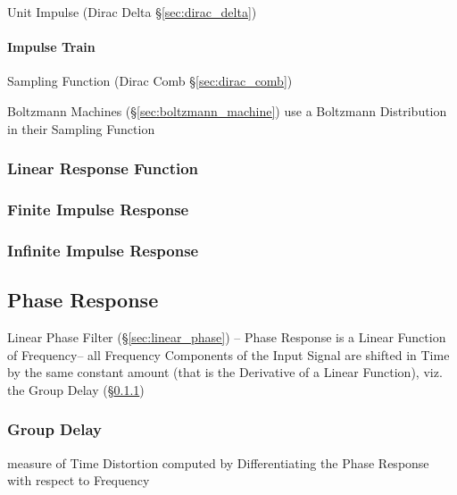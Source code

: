 Unit Impulse (Dirac Delta \S\ref{sec:dirac_delta})



\paragraph{Impulse Train}\label{sec:impulse_train}\hfill

Sampling Function (Dirac Comb \S\ref{sec:dirac_comb})

Boltzmann Machines (\S\ref{sec:boltzmann_machine}) use a Boltzmann Distribution
in their Sampling Function



\subsubsection{Linear Response Function}\label{sec:linear_response}

\subsubsection{Finite Impulse Response}\label{sec:fir}

\subsubsection{Infinite Impulse Response}\label{sec:iir}



\subsection{Phase Response}\label{sec:phase_response}

Linear Phase Filter (\S\ref{sec:linear_phase}) -- Phase Response is a Linear
Function of Frequency-- all Frequency Components of the Input Signal are shifted
in Time by the same constant amount (that is the Derivative of a Linear
Function), viz. the Group Delay (\S\ref{sec:group_delay})



\subsubsection{Group Delay}\label{sec:group_delay}

measure of Time Distortion computed by Differentiating the Phase Response with
respect to Frequency

